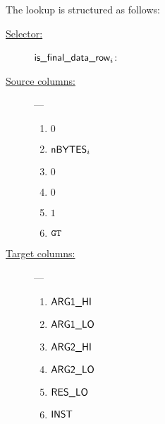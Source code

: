 The lookup is structured as follows:
\begin{description}
	\item[\underline{Selector:}] $\textsf{is\_final\_data\_row} _{i}$:
	\item[\underline{Source columns:}] ---
		\begin{multicols}{3}
			\begin{enumerate}
				\item $0$
				\item $\textsf{nBYTES}_{i}$
				\item $0$
				\item $0$
				\item $1$
				\item $\texttt{GT}$
			\end{enumerate}
		\end{multicols}
	\item[\underline{Target columns:}] ---
		\begin{multicols}{3}
		\begin{enumerate}
			\item $\textsf{ARG}\textsf{1}\textsf{\_HI}$
			\item $\textsf{ARG}\textsf{1}\textsf{\_LO}$
			\item $\textsf{ARG}\textsf{2}\textsf{\_HI}$
			\item $\textsf{ARG}\textsf{2}\textsf{\_LO}$
			\item $\textsf{RES}\textsf{\_LO}$
			\item $\textsf{INST}$
		\end{enumerate}
		\end{multicols}
\end{description}
